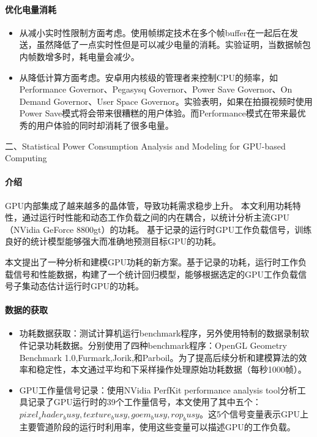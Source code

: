 \documentclass[a4paper]{article}
\begin{document}
\paragraph{优化电量消耗}
\begin{itemize}
\item 从减小实时性限制方面考虑。使用帧绑定技术在多个帧buffer在一起后在发送，虽然降低了一点实时性但是可以减少电量的消耗。实验证明，当数据帧包内帧数增多时，耗电量会减少。
\item 从降低计算方面考虑。安卓用内核级的管理者来控制CPU的频率，如Performance Governor、Pegasysq Governor、Power Save Governor、On Demand Governor、User Space Governor。实验表明，如果在拍摄视频时使用Power Save模式将会带来很糟糕的用户体验。而Performance模式在带来最优秀的用户体验的同时却消耗了很多电量。
\end{itemize}


二、Statistical Power Consumption Analysis and Modeling for GPU-based Computing

\paragraph{介绍}
GPU内部集成了越来越多的晶体管，导致功耗需求稳步上升。 本文利用功耗特性，通过运行时性能和动态工作负载之间的内在耦合，以统计分析主流GPU（NVidia GeForce 8800gt）的功耗。 基于记录的运行时GPU工作负载信号，训练良好的统计模型能够强大而准确地预测目标GPU的功耗。

本文提出了一种分析和建模GPU功耗的新方案。基于记录的功耗，运行时工作负载信号和性能数据，构建了一个统计回归模型，能够根据选定的GPU工作负载信号子集动态估计运行时GPU的功耗。
\paragraph{数据的获取}
\begin{itemize}
\item 功耗数据获取：测试计算机运行benchmark程序，另外使用特制的数据录制软件记录功耗数据。分别使用了四种benchmark程序：OpenGL Geometry Benchmark 1.0,Furmark,Jorik,和Parboil。为了提高后续分析和建模算法的效率和稳定性，本文通过平均和下采样操作处理原始功耗数据（每秒1000帧）。
\item GPU工作量信号记录：使用NVidia PerfKit performance analysis tool分析工具记录了GPU运行时的39个工作量信号，本文使用了其中五个：$pixel_shader_busy, texture_busy, goem_busy, rop_busy$。这5个信号变量表示GPU上主要管道阶段的运行时利用率，使用这些变量可以描述GPU的工作负载。
\end{itemize}
\end{document}

